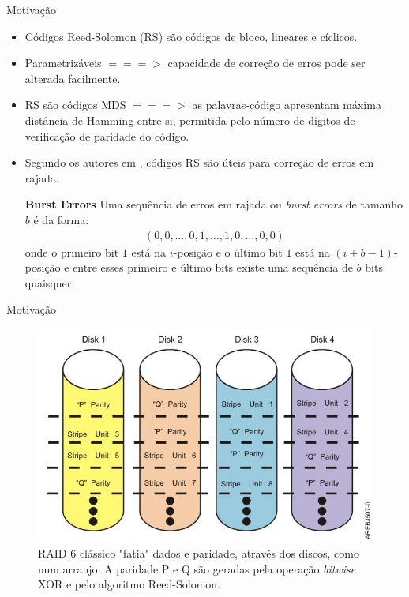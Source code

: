   \begin{frame}{Motivação}
     \begin{itemize}
        \item Códigos Reed-Solomon (RS) são códigos de bloco, lineares e cíclicos.
        \item Parametrizáveis $===>$ capacidade de correção de erros pode ser alterada facilmente.
        \item RS são códigos MDS $===>$ as palavras-código apresentam máxima distância de Hamming entre si, permitida pelo número de dígitos de verificação de paridade do código.
        \item Segundo os autores em \cite{Almeida:2007,Sloane:1977}, códigos RS são úteis para correção de erros em rajada.
\begin{definition} {\bf Burst Errors}  Uma sequência de erros em rajada ou \emph{burst errors} de tamanho $b$ é da forma:
    \begin{align*}
     (0, 0, \ldots, 0, 1, \ldots , 1, 0, \ldots, 0, 0)
    \end{align*}
onde o primeiro bit $1$ está na $i$-posição e o último bit $1$ está na $(i+b-1)$-posição e entre esses primeiro e último bits existe uma sequência de $b$ bits quaisquer.
\end{definition}
     \end{itemize}
  \end{frame}

  \begin{frame}{Motivação}
   \begin{figure}[h]
     \centering
     \includegraphics[scale=.4]{raid6.jpg}
     \caption{RAID 6 clássico "fatia" dados e paridade, através dos discos, como num arranjo. A paridade P e Q são geradas pela operação \emph{bitwise} XOR e pelo algoritmo Reed-Solomon.\cite{Plank:2004}}
     \label{fig6:raid6}
   \end{figure}
  \end{frame}

